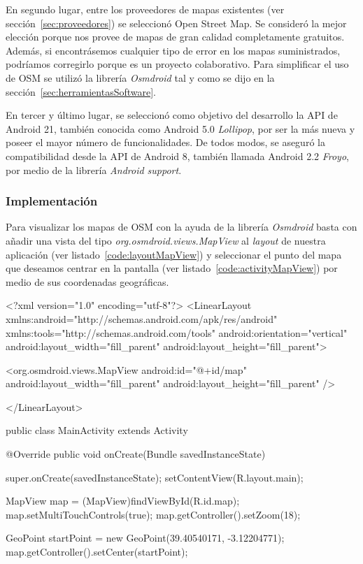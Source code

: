 En segundo lugar, entre los proveedores de mapas existentes (ver sección~\ref{sec:proveedores}) se
seleccionó Open Street Map. Se consideró la mejor elección porque nos provee de mapas de gran
calidad completamente gratuitos. Además, si encontrásemos cualquier tipo de error en los mapas
suministrados, podríamos corregirlo porque es un proyecto colaborativo. Para simplificar el uso de
\acs{OSM} se utilizó la librería \emph{Osmdroid} tal y como se dijo en la
sección~\ref{sec:herramientasSoftware}.

En tercer y último lugar, se seleccionó como objetivo del desarrollo la \acs{API} de Android 21,
también conocida como Android 5.0 \emph{Lollipop}, por ser la más nueva y poseer el mayor número de
funcionalidades. De todos modos, se aseguró la compatibilidad desde la \acs{API} de Android 8,
también llamada Android 2.2 \emph{Froyo}, por medio de la librería \emph{Android support}.

\subsubsection{Implementación}

Para visualizar los mapas de \acs{OSM} con la ayuda de la librería \emph{Osmdroid} basta con añadir
una vista del tipo \emph{org.osmdroid.views.MapView} al \emph{layout} de nuestra aplicación (ver
listado~\ref{code:layoutMapView}) y seleccionar el punto del mapa que deseamos centrar en la
pantalla (ver listado~\ref{code:activityMapView}) por medio de sus coordenadas geográficas.

\begin{listing}[
  float=ht,
  language = xml,
  caption  = {Ejemplo de \emph{layout} usando \emph{org.osmdroid.views.MapView}},
  label    = code:layoutMapView]
<?xml version="1.0" encoding="utf-8"?>
<LinearLayout xmlns:android="http://schemas.android.com/apk/res/android"
        xmlns:tools="http://schemas.android.com/tools"
        android:orientation="vertical" 
        android:layout_width="fill_parent"
        android:layout_height="fill_parent">
        
        <org.osmdroid.views.MapView android:id="@+id/map"
                android:layout_width="fill_parent" 
                android:layout_height="fill_parent" />
                
</LinearLayout>
\end{listing}

\begin{listing}[
  float=ht,
  language = java,
  caption  = {Ejemplo de \emph{activity} mostrando un punto de un mapa en específico},
  label    = code:activityMapView]
public class MainActivity extends Activity {
    @Override public void onCreate(Bundle savedInstanceState) {
        super.onCreate(savedInstanceState);
        setContentView(R.layout.main);

        MapView map = (MapView)findViewById(R.id.map);
        map.setMultiTouchControls(true);
        map.getController().setZoom(18);

        GeoPoint startPoint = new GeoPoint(39.40540171, -3.12204771);
        map.getController().setCenter(startPoint);
    }
}
\end{listing}


